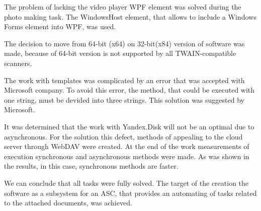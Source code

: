 \documentclass[12pt,journal,compsoc]{D:/Магистратура/English/bare_conf/IEEEtran}
\begin{document}
The problem of lacking the video player WPF element was solved during the photo making task. The WindowsHost element, that allows to include a Windows Forms element into WPF, was used.

The decision to move from 64-bit (x64) on 32-bit(x84) version of software was made, because of 64-bit version is not supported by all TWAIN-compatible scanners.

The work with templates was complicated by an error that was accepted with Microsoft company. To avoid this error, the method, that could be executed with one string, must be devided into three strings. This solution was suggested by Microsoft.

It was determined that the work with Yandex.Disk will not be an optimal due to asynchronous. For the solution this defect, methods of appealing to the cloud server through WebDAV were created. At the end of the work measurements of execution synchronous and asynchronous methods were made. As was shown in the results, in this case, synchronous methods are faster.

We can conclude that all tasks were fully solved. The target of the creation the software as a subsystem for an ASC, that provides an automating of tasks related to the attached documents, was achieved.
\end{document}
